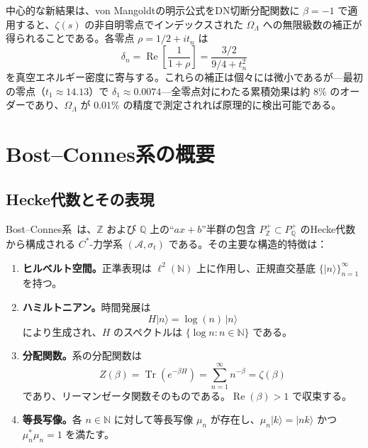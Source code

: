 \documentclass[12pt,a4paper]{article}
\newcommand{\Tr}{\operatorname{Tr}}
\newcommand{\OL}{\Omega_\Lambda}
\begin{document}
中心的な新結果は、von Mangoldtの明示公式をDN切断分配関数に $\beta = -1$ で適用すると、$\zeta(s)$ の非自明零点でインデックスされた $\OL$ への無限級数の補正が得られることである。各零点 $\rho = 1/2 + it_n$ は
\begin{equation}\label{eq:correction-preview}
  \delta_n = \operatorname{Re}\!\left[\frac{1}{1+\rho}\right] = \frac{3/2}{9/4 + t_n^2}
\end{equation}
を真空エネルギー密度に寄与する。これらの補正は個々には微小であるが---最初の零点（$t_1 \approx 14.13$）で $\delta_1 \approx 0.0074$---全零点対にわたる累積効果は約 $8\%$ のオーダーであり、$\OL$ が $0.01\%$ の精度で測定されれば原理的に検出可能である。

\section{Bost--Connes系の概要}
\label{sec:BC-review}

\subsection{Hecke代数とその表現}

Bost--Connes系~\cite{BostConnes1995,ConnesMarcolli2008}は、$\mathbb{Z}$ および $\mathbb{Q}$ 上の``$ax+b$''半群の包含 $P_\mathbb{Z}^+ \subset P_\mathbb{Q}^+$ のHecke代数から構成される $C^*$-力学系 $(\mathcal{A},\sigma_t)$ である。その主要な構造的特徴は：

\begin{enumerate}[label=(\roman*)]
\item \textbf{ヒルベルト空間。}正準表現は $\ell^2(\mathbb{N})$ 上に作用し、正規直交基底 $\{|n\rangle\}_{n=1}^\infty$ を持つ。
\item \textbf{ハミルトニアン。}時間発展は
\begin{equation}\label{eq:BC-Hamiltonian}
  H|n\rangle = \log(n)\,|n\rangle
\end{equation}
により生成され、$H$ のスペクトルは $\{\log n : n \in \mathbb{N}\}$ である。
\item \textbf{分配関数。}系の分配関数は
\begin{equation}\label{eq:BC-partition}
  Z(\beta) = \Tr(e^{-\beta H}) = \sum_{n=1}^{\infty} n^{-\beta} = \zeta(\beta)
\end{equation}
であり、リーマンゼータ関数そのものである。$\operatorname{Re}(\beta) > 1$ で収束する。
\item \textbf{等長写像。}各 $n \in \mathbb{N}$ に対して等長写像 $\mu_n$ が存在し、$\mu_n|k\rangle = |nk\rangle$ かつ $\mu_n^*\mu_n = 1$ を満たす。
\end{enumerate}
\end{document}
